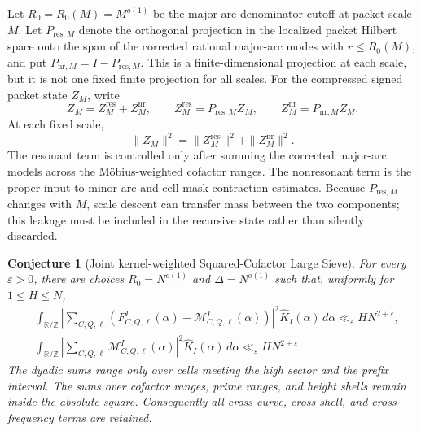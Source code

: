 \documentclass[11pt]{article}
\newtheorem{conjecture}[theorem]{Conjecture}
\theoremstyle{definition}
\theoremstyle{remark}
\newcommand{\eps}{\varepsilon}
\newcommand{\1}{\mathbf{1}}
\begin{document}
Let $R_0=R_0(M)=M^{o(1)}$ be the major-arc denominator cutoff at packet scale $M$.
Let $P_{\mathrm{res},M}$ denote the orthogonal projection in the localized packet
Hilbert space onto the span of the corrected rational major-arc modes with
$r\le R_0(M)$, and put $P_{\mathrm{nr},M}=I-P_{\mathrm{res},M}$.  This is a
finite-dimensional projection at each scale, but it is not one fixed finite
projection for all scales.  For the compressed signed packet state $Z_M$, write
\begin{equation}
 Z_M=Z_M^{\mathrm{res}}+Z_M^{\mathrm{nr}},
 \qquad
 Z_M^{\mathrm{res}}=P_{\mathrm{res},M}Z_M,
 \qquad
 Z_M^{\mathrm{nr}}=P_{\mathrm{nr},M}Z_M.
 \label{eq:resonant-nonresonant-state}
\end{equation}
At each fixed scale,
\begin{equation}
 \boxed{
 \|Z_M\|^2=\|Z_M^{\mathrm{res}}\|^2+\|Z_M^{\mathrm{nr}}\|^2.
 }
 \label{eq:resonant-energy-split}
\end{equation}
The resonant term is controlled only after summing the corrected major-arc models
across the M\"obius-weighted cofactor ranges.  The nonresonant term is the proper
input to minor-arc and cell-mask contraction estimates.  Because
$P_{\mathrm{res},M}$ changes with $M$, scale descent can transfer mass between the
two components; this leakage must be included in the recursive state rather than
silently discarded.

\begin{conjecture}[Joint kernel-weighted Squared-Cofactor Large Sieve]
\label{conj:squared-cofactor-large-sieve}
For every $\eps>0$, there are choices
$R_0=N^{o(1)}$ and $\Delta=N^{o(1)}$ such that, uniformly for
$1\le H\le N$,
\begin{align}
 &\int_{\mathbb R/\mathbb Z}
 \left|
 \sum_{C,Q,\ell}
 \left(
 F_{C,Q,\ell}^{I}(\alpha)
 -\mathcal M_{C,Q,\ell}^{I}(\alpha)
 \right)
 \right|^2
 \widehat K_I(\alpha)\,d\alpha
 \ll_\eps HN^{2+\eps},
 \label{eq:cofactor-large-sieve-remainder}\\
 &\int_{\mathbb R/\mathbb Z}
 \left|
 \sum_{C,Q,\ell}
 \mathcal M_{C,Q,\ell}^{I}(\alpha)
 \right|^2
 \widehat K_I(\alpha)\,d\alpha
 \ll_\eps HN^{2+\eps}.
 \label{eq:cofactor-large-sieve-major}
\end{align}
The dyadic sums range only over cells meeting the high sector and the prefix
interval.  The sums over cofactor ranges, prime ranges, and height shells remain
\emph{inside} the absolute square.  Consequently all cross-curve, cross-shell, and
cross-frequency terms are retained.
\end{conjecture}
\end{document}

